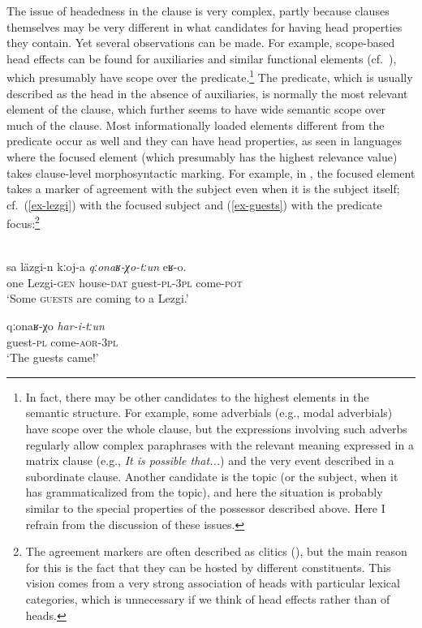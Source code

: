 \documentclass[output=paper
  ,nobabel
  ,draftmode
  ,colorlinks, citecolor=brown
]{langscibook}
\begin{document}
The issue of headedness in the clause is very complex, partly because clauses themselves may be very
different in what candidates for having head properties they contain. Yet several observations can
be made. For example, scope-based head effects can be found for auxiliaries and similar functional
elements (cf.\ \cite{Zwicky85a}), which presumably have scope over the predicate.\footnote{In fact,
  there may be other candidates to the highest elements in the semantic structure. For example, some
  adverbials (e.g., modal adverbials) have scope over the whole clause, but the expressions
  involving such adverbs regularly allow complex paraphrases with the relevant meaning expressed in
  a matrix clause (e.g., \emph{It is possible that...}) and the very event described in a
  subordinate clause. Another candidate is the topic (or the subject, when it has grammaticalized
  from the topic), and here the situation is probably similar to the special properties of the
  possessor described above. Here I refrain from the discussion of these issues.} The predicate,
which is usually described as the head in the absence of auxiliaries, is normally the most relevant
element of the clause, which further seems to have wide semantic scope over much of the clause. Most
informationally loaded elements different from the predicate occur as well and they can have head
properties, as seen in languages where the focused element (which presumably has the highest
relevance value) takes clause-level morphosyntactic marking. For example, in , the focused
element takes a marker of agreement with the subject even when it is the subject itself;
cf.\ (\ref{ex-lezgi}) with the focused subject and (\ref{ex-guests}) with the predicate
focus:\footnote{The  agreement markers are often described as clitics (\cite{Harris2002}), but
  the main reason for this is the fact that they can be hosted by different constituents. This
  vision comes from a very strong association of heads with particular lexical categories, which is
  unnecessary if we think of head effects rather than of heads.} 

\newpage
\ea
{}\\
\ea\label{ex-lezgi}
\gll sa	läzgi-n	kːoj-a  \emph{qːonaʁ-χo-tːun} eʁ-o.  \\ 
     one Lezgi-\textsc{gen}  house-\textsc{dat} guest-\textsc{pl-3pl}	come-\textsc{pot} \\
\glt `Some \textsc{guests} are coming to a Lezgi.'

\ex\label{ex-guests}
\gll qːonaʁ-χo	\emph{har-i-tːun}\\ guest-\textsc{pl} come-\textsc{aor-3pl} \\
\glt `The guests came!'
\z\z
\end{document}

